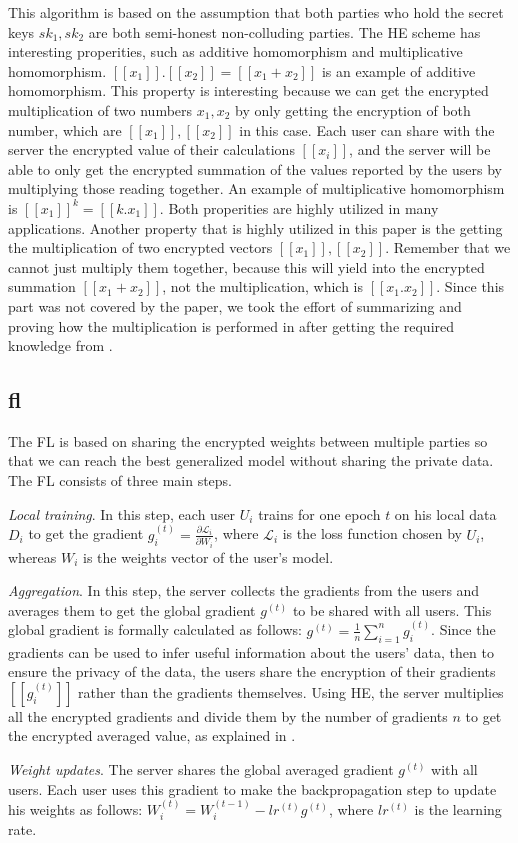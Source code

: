 This algorithm is based on the assumption that both parties who hold the secret keys $sk_1, sk_2$ are both semi-honest non-colluding parties.
The HE scheme has interesting properities, such as additive homomorphism and multiplicative homomorphism.
$[[x_1]].[[x_2]] = [[x_1 + x_2]]$ is an example of additive homomorphism.
This property is interesting because we can get the encrypted multiplication of two numbers $x_1, x_2$ by only getting the encryption of both number, which are $[[x_1]], [[x_2]]$ in this case.
Each user can share with the server the encrypted value of their calculations $[[x_i]]$, and the server will be able to only get the encrypted summation of the values reported by the users by multiplying those reading together.
An example of multiplicative homomorphism is $[[x_1]]^k = [[k . x_1]]$.
Both properities are highly utilized in many applications.
Another property that is highly utilized in this paper is the getting the multiplication of two encrypted vectors $[[x_1]], [[x_2]]$.
Remember that we cannot just multiply them together, because this will yield into the encrypted summation $[[x_1 + x_2]]$, not the multiplication, which is $[[x_1 . x_2]]$.
Since this part was not covered by the paper, we took the effort of summarizing and proving how the multiplication is performed in  after getting the required knowledge from \cite{liu2016efficient2}.

\subsection{\acf{fl}}
\label{sec:preliminaries-fl}
The FL is based on sharing the encrypted weights between multiple parties so that we can reach the best generalized model without sharing the private data.
The FL consists of three main steps.
\begin{enumerate*}[label=(\roman*)]
\item \emph{Local training}.
In this step, each user $U_i$ trains for one epoch $t$ on his local data $D_i$ to get the gradient $g_i^{(t)} = \frac{\partial \mathcal{L}_i}{\partial W_i}$, where $\mathcal{L}_i$ is the loss function chosen by $U_i$, whereas $W_i$ is the weights vector of the user's model.
\item \emph{Aggregation}.
In this step, the server collects the gradients from the users and averages them to get the global gradient $g^{(t)}$ to be shared with all users.
This global gradient is formally calculated as follows: $g^{(t)} = \frac{1}{n} \sum_{i=1}^n g_i^{(t)}$.
Since the gradients can be used to infer useful information about the users' data, then to ensure the privacy of the data, the users share the encryption of their gradients $[[g_i^{(t)}]]$ rather than the gradients themselves.
Using HE, the server multiplies all the encrypted gradients and divide them by the number of gradients $n$ to get the encrypted averaged value, as explained in .
\item \emph{Weight updates}.
The server shares the global averaged gradient $g^(t)$ with all users.
Each user uses this gradient to make the backpropagation step to update his weights as follows: $W_i^{(t)} = W_i^{(t-1)} - lr^{(t)} g^{(t)}$, where $lr^{(t)}$ is the learning rate.
\end{enumerate*}
